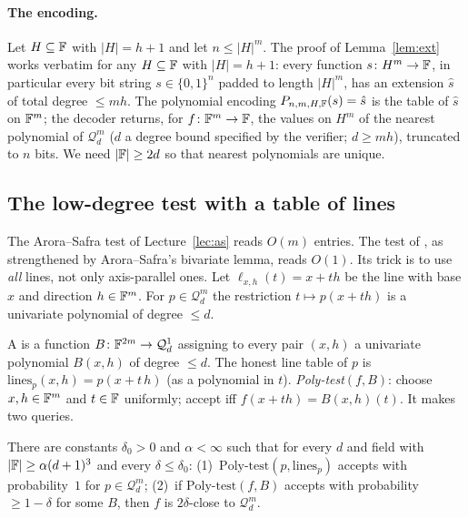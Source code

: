 \paragraph{The encoding.}  Let $H\subseteq\mathbb{F}$ with $|H|=h+1$ and let $n\le|H|^m$.  The proof of Lemma~\ref{lem:ext} works verbatim for any $H\subseteq\mathbb{F}$ with $|H|=h+1$: every function $s\colon H^m\to\mathbb{F}$, in particular every bit string $s\in\{0,1\}^n$ padded to length $|H|^m$,
has an extension $\hat s$ of total degree $\le mh$.  The polynomial encoding $P_{n,m,H,\mathbb{F}}(s)=\hat s$ is the table of $\hat s$ on $\mathbb{F}^m$; the decoder
returns, for $f\colon\mathbb{F}^m\to\mathbb{F}$, the values on $H^m$ of the nearest polynomial of $\mathcal Q^m_{d}$ ($d$ a degree bound specified by the verifier; $d\ge mh$), truncated to $n$ bits.  We need $|\mathbb{F}|\ge2d$ so that nearest polynomials are unique.

\subsection{The low-degree test with a table of lines}

The Arora--Safra test of Lecture~\ref{lec:as} reads $O(m)$ entries.  The test of \citet{RubinfeldSudan96}, as strengthened by Arora--Safra's bivariate lemma, reads $O(1)$.
Its trick is to use \emph{all} lines, not only axis-parallel ones.  Let $\ell_{x,h}(t)=x+th$ be the line with base $x$ and direction $h\in\mathbb{F}^m$.  For $p\in\mathcal Q^m_d$ the restriction $t\mapsto p(x+th)$ is a univariate polynomial of degree $\le d$.

\begin{definition}\label{def:polytest}
A  is a function $B\colon\mathbb{F}^{2m}\to\mathcal Q^1_d$ assigning to every pair $(x,h)$ a univariate polynomial $B(x,h)$ of degree $\le d$.  The honest line table of $p$ is $\mathrm{lines}_p(x,h)=p(x+t\,h)$ (as a polynomial in $t$).
\emph{Poly-test}$(f,B)$: choose $x,h\in\mathbb{F}^m$ and $t\in\mathbb{F}$ uniformly; accept iff $f(x+th)=B(x,h)(t)$.  It makes two queries.
\end{definition}

\begin{theorem}\label{thm:polytest}
There are constants $\delta_0>0$ and $\alpha<\infty$ such that for every $d$ and field with $|\mathbb{F}|\ge\alpha(d+1)^3$ and every $\delta\le\delta_0$: (1)~$\mathrm{Poly\text{-}test}(p,\mathrm{lines}_p)$ accepts with probability~$1$ for $p\in\mathcal Q^m_d$;
(2)~if $\mathrm{Poly\text{-}test}(f,B)$ accepts with probability $\ge1-\delta$ for some $B$, then $f$ is $2\delta$-close to $\mathcal Q^m_d$.
\end{theorem}

